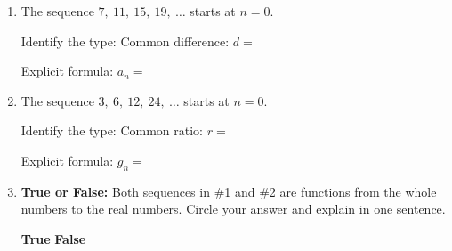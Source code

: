 \documentclass[10pt]{article}
\begin{document}
\namedateperiod

\vspace{0.16in}

\begin{enumerate}[itemsep=20pt]

\item The sequence $7,\ 11,\ 15,\ 19,\ \ldots$ starts at $n = 0$.

      Identify the type: \blank{3cm} \quad Common difference: $d = $ \blank{2cm}

      \vspace{0.06in}
      Explicit formula: $a_n = $ \blank{5cm}

\item The sequence $3,\ 6,\ 12,\ 24,\ \ldots$ starts at $n = 0$.

      Identify the type: \blank{3cm} \quad Common ratio: $r = $ \blank{2cm}

      \vspace{0.06in}
      Explicit formula: $g_n = $ \blank{5cm}

\item \textbf{True or False:} Both sequences in \#1 and \#2 are functions from the whole
      numbers to the real numbers. Circle your answer and explain in one sentence.

      \medskip
      \textbf{True} \qquad\quad \textbf{False}

      \vspace{0.06in}
      \writeline

\end{enumerate}
\end{document}
